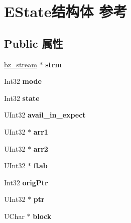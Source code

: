\hypertarget{struct_e_state}{}\section{E\+State结构体 参考}
\label{struct_e_state}
\subsection*{Public 属性}
\begin{DoxyCompactItemize}
\item 
\mbox{\label{struct_e_state_a7063b24558691ab4405a034558ca0780}} 
\hyperlink{structbz__stream}{bz\+\_\+stream} $\ast$ {\bfseries strm}
\item 
\mbox{\label{struct_e_state_aa8bcff8ad3c08aa1d4104f3a1f98675e}} 
Int32 {\bfseries mode}
\item 
\mbox{\label{struct_e_state_a103955affd2678bb4be0b7d272cea6d8}} 
Int32 {\bfseries state}
\item 
\mbox{\label{struct_e_state_a2c253cc7ac4cb5906bfa27a95f9d8f40}} 
U\+Int32 {\bfseries avail\+\_\+in\+\_\+expect}
\item 
\mbox{\label{struct_e_state_a913260bad0cf37079a08b9a133293aaa}} 
U\+Int32 $\ast$ {\bfseries arr1}
\item 
\mbox{\label{struct_e_state_ae482d96bff0988edaf4422eef4a7050c}} 
U\+Int32 $\ast$ {\bfseries arr2}
\item 
\mbox{\label{struct_e_state_a28875568269ede0a2e40d6ec21636113}} 
U\+Int32 $\ast$ {\bfseries ftab}
\item 
\mbox{\label{struct_e_state_ae5f37ef91f4b3a4165f99a7444eeae6f}} 
Int32 {\bfseries orig\+Ptr}
\item 
\mbox{\label{struct_e_state_a6d014c56a52f7f0a4c680ddbae266577}} 
U\+Int32 $\ast$ {\bfseries ptr}
\item 
\mbox{\label{struct_e_state_a01dfb158ecac9c783c7007cdb6f4a134}} 
U\+Char $\ast$ {\bfseries block}

\end{DoxyCompactItemize}
